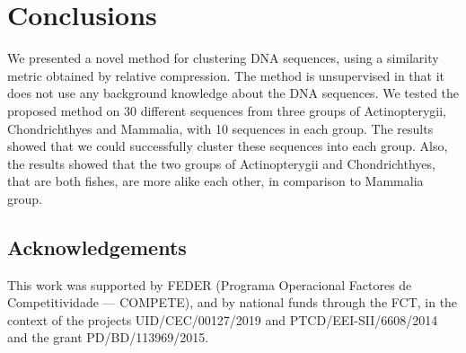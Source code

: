 \documentclass[extendedabs]{recpad2k}
\begin{document}
\section{Conclusions}
We presented a novel method for clustering DNA sequences, using a similarity metric obtained by relative compression. The method is unsupervised in that it does not use any background knowledge about the DNA sequences. We tested the proposed method on 30 different sequences from three groups of Actinopterygii, Chondrichthyes and Mammalia, with 10 sequences in each group. The results showed that we could successfully cluster these sequences into each group. Also, the results showed that the two groups of Actinopterygii and Chondrichthyes, that are both fishes, are more alike each other, in comparison to Mammalia group.

\subsection*{Acknowledgements}
This work was supported by FEDER (Programa Operacional Factores de Competitividade — COMPETE), and by national funds through the FCT, in the context of the projects UID/CEC/00127/2019 and PTCD/EEI-SII/6608/2014 and the grant PD/BD/113969/2015.



\end{document}
